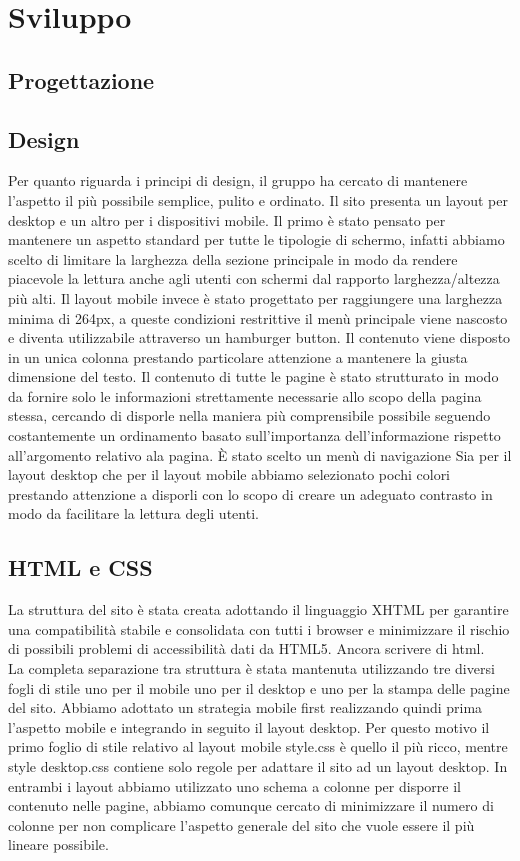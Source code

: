 \section{Sviluppo}

\subsection{Progettazione}

\subsection{Design}
Per quanto riguarda i principi di design, il gruppo ha cercato di mantenere l'aspetto il più possibile semplice, pulito e ordinato. Il sito presenta un layout per desktop e un altro per i dispositivi mobile. Il primo è stato pensato per mantenere un aspetto standard per tutte le tipologie di schermo, infatti abbiamo scelto di limitare la larghezza della sezione principale in modo da rendere piacevole la lettura anche agli utenti con schermi dal rapporto larghezza/altezza più alti. Il layout mobile invece è stato progettato per raggiungere una larghezza minima di 264px, a queste condizioni restrittive il menù principale viene nascosto e diventa utilizzabile attraverso un hamburger button. Il contenuto viene disposto in un unica colonna prestando particolare attenzione a mantenere la giusta dimensione del testo. Il contenuto di tutte le pagine è stato strutturato in modo da fornire solo le informazioni strettamente necessarie allo scopo della pagina stessa, cercando di disporle nella maniera più comprensibile possibile seguendo costantemente un ordinamento basato sull'importanza dell'informazione rispetto all'argomento relativo ala pagina. È stato scelto un menù di navigazione Sia per il layout desktop che per il layout mobile abbiamo selezionato pochi colori prestando attenzione a disporli con lo scopo di creare un adeguato contrasto in modo da facilitare la lettura degli utenti. 
\subsection{HTML e CSS}
La struttura del sito è stata creata adottando il linguaggio XHTML per garantire una compatibilità stabile e consolidata con tutti i browser e minimizzare il rischio di possibili problemi di accessibilità dati da HTML5.
Ancora scrivere di html.
\\
La completa separazione tra struttura è stata mantenuta utilizzando tre diversi fogli di stile uno per il mobile uno per il desktop e uno per la stampa delle pagine del sito. Abbiamo adottato un strategia mobile first realizzando quindi prima l'aspetto mobile e integrando in seguito il layout desktop. Per questo motivo il primo foglio di stile relativo al layout mobile style.css è quello il più ricco, mentre style desktop.css contiene solo regole per adattare il sito ad un layout desktop. In entrambi i layout abbiamo utilizzato uno schema a colonne per disporre il contenuto nelle pagine, abbiamo comunque cercato di minimizzare il numero di colonne per non complicare l'aspetto generale del sito che vuole essere il più lineare possibile.

